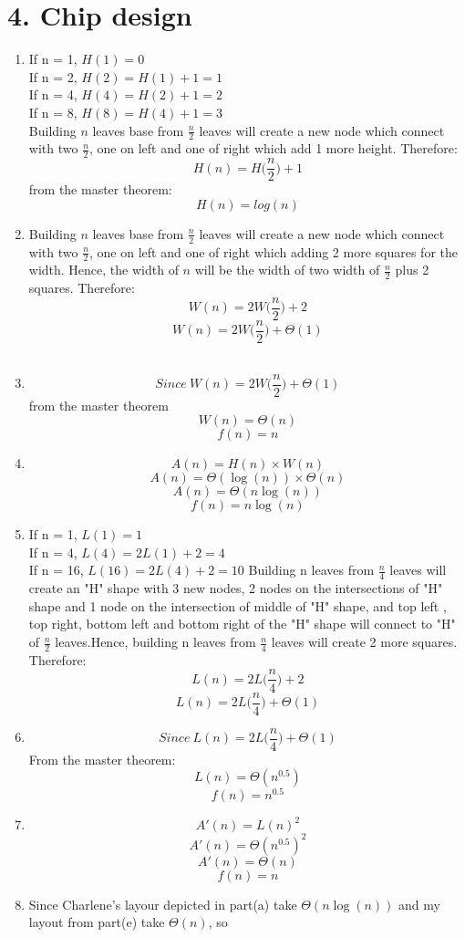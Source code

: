 \documentclass[11pt]{article}
\newenvironment{qparts}{\begin{enumerate}[{(}a{)}]}{\end{enumerate}}
\begin{document}
\section*{4. Chip design}
\begin{qparts}
\item
If n = 1, $H(1) = 0$\\
If n = 2, $H(2) = H(1) + 1 = 1$\\
If n = 4, $H(4) = H(2) + 1 = 2$\\
If n = 8, $H(8) = H(4) + 1 = 3$\\
Building $n$ leaves base from $\frac{n}{2}$ leaves will create a new node which connect with two $\frac{n}{2}$, one on left and one of right which add 1 more height. Therefore: 
$$H(n) = H\Big(\frac{n}{2}\Big) + 1$$
from the master theorem:
$$\boxed{H(n) = log(n)}$$

\item
Building $n$ leaves base from $\frac{n}{2}$ leaves will create a new node which connect with two $\frac{n}{2}$, one on left and one of right which adding 2 more squares for the width. Hence, the width of $n$ will be the width of two width of $\frac{n}{2}$ plus 2 squares. Therefore:
$$W(n) = 2W\Big(\frac{n}{2}\Big) + 2$$
$$\boxed{W(n) = 2W\Big(\frac{n}{2}\Big) + \Theta(1)}$$
\\
\item
$$Since\ W(n) = 2W\Big(\frac{n}{2}\Big) + \Theta(1)$$
from the master theorem
$$\boxed{W(n) = \Theta(n)}$$
$$\boxed{f(n) = n}$$
\item
$$A(n) = H(n) \times W(n)$$
$$A(n) = \Theta(\log(n)) \times \Theta(n)$$
$$\boxed{A(n) = \Theta(n\log(n))}$$
$$\boxed{f(n) = n\log(n)}$$
\item
If n = 1, $L(1) = 1$\\
If n = 4, $L(4) = 2L(1)  + 2 = 4$\\
If n = 16, $L(16) = 2L(4) + 2 = 10$
Building n leaves from $\frac{n}{4}$ leaves will create an "H" shape with 3 new nodes, 2 nodes on the intersections of "H" shape and 1 node on the intersection of middle of "H" shape, and top left , top right, bottom left and bottom right of the "H" shape will connect to "H" of $\frac{n}{2}$ leaves.Hence, building n leaves from $\frac{n}{4}$ leaves will create 2 more squares. Therefore:
$$L(n) = 2L\Big(\frac{n}{4}\Big) + 2$$
$$\boxed{L(n) = 2L\Big(\frac{n}{4}\Big) + \Theta(1)}$$
\item
$$Since\ L(n) = 2L\Big(\frac{n}{4}\Big) + \Theta(1)$$
From the master theorem:
$$\boxed{L(n) = \Theta(n^{0.5})}$$
$$\boxed{f(n) = n^{0.5}}$$
\item
$$A'(n) = L(n)^2$$
$$A'(n) = \Theta(n^{0.5})^2$$
$$\boxed{A'(n) = \Theta(n)}$$
$$\boxed{f(n) = n}$$
\item
Since Charlene's layour depicted in part(a) take $\Theta(n\log(n))$ and my layout from part(e) take $\Theta(n)$, so 

\end{qparts}
\end{document}
